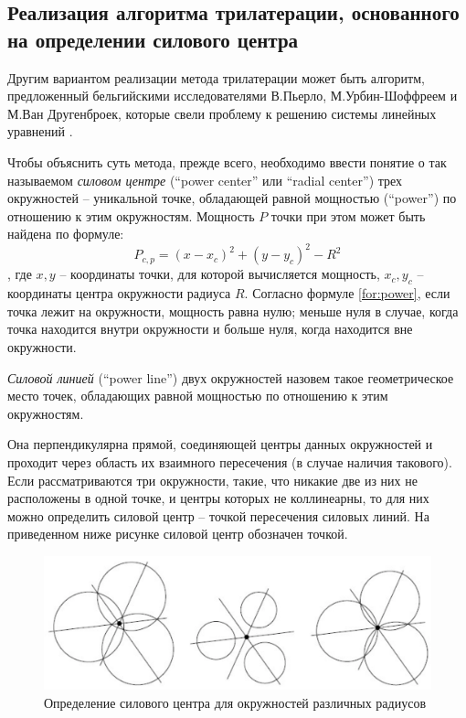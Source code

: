 \subsection{Реализация алгоритма трилатерации, основанного на определении силового центра}

Другим вариантом реализации метода трилатерации может быть алгоритм, предложенный бельгийскими исследователями В.Пьерло, М.Ур\-бин-Шоф\-фреем и М.Ван Другенброек, которые свели проблему к решению системы линейных уравнений \cite{pierlot2011new}.

Чтобы объяснить суть метода, прежде всего, необходимо ввести понятие о так называемом \textit{силовом центре} (“power center” или “radial center”) трех окружностей – уникальной точке, обладающей равной мощностью (“power”) по отношению к этим окружностям. Мощность $P$ точки при этом может быть найдена по формуле:
\begin{equation} \label{for:power}
    P_{c,p} = (x-x_c)^2 + (y-y_c)^2 - R^2
\end{equation}
, где ${x, y}$ – координаты точки, для которой вычисляется мощность, ${x_c, y_c}$ – координаты центра окружности радиуса $R$. Согласно формуле \ref{for:power}, если точка лежит на окружности, мощность равна нулю; меньше нуля в случае, когда точка находится внутри окружности и больше нуля, когда находится вне окружности.

\textit{Силовой линией }(“power line”) двух окружностей назовем такое геометрическое место точек, обладающих равной мощностью по отношению к этим окружностям. 

Она перпендикулярна прямой, соединяющей центры данных окружностей и проходит через область их взаимного пересечения (в случае наличия такового). Если рассматриваются три окружности, такие, что никакие две из них не расположены в одной точке, и центры которых не коллинеарны, то для них можно определить силовой центр – точкой пересечения силовых линий. На приведенном ниже рисунке силовой центр обозначен точкой.

\begin{figure}[ht]
    \centering
    \includegraphics[width=\textwidth]{img/powerCenters}
    \caption{Определение силового центра для окружностей различных радиусов}
\end{figure}

